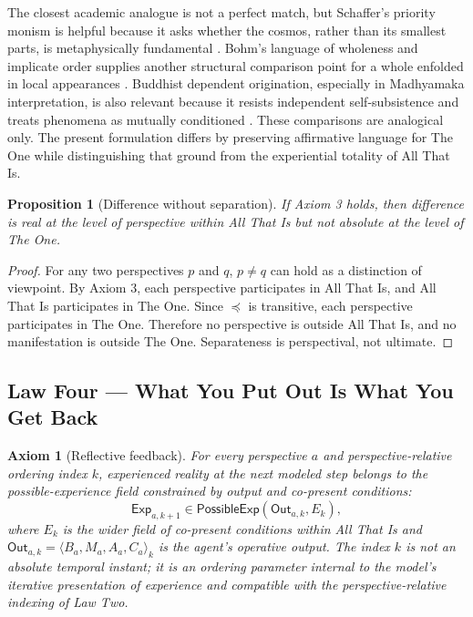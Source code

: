 \documentclass[11pt]{article}
\newtheorem{axiom}{Axiom}
\newtheorem{proposition}{Proposition}
\newcommand{\Out}{\mathsf{Out}}
\newcommand{\Exp}{\mathsf{Exp}}
\newcommand{\PossExp}{\mathsf{PossibleExp}}
\newcommand{\Ground}{\preceq}
\begin{document}
The closest academic analogue is not a perfect match, but Schaffer's priority monism is helpful because it asks whether the cosmos, rather than its smallest parts, is metaphysically fundamental \cite{Schaffer2010}.  Bohm's language of wholeness and implicate order supplies another structural comparison point for a whole enfolded in local appearances \cite{Bohm1980}.  Buddhist dependent origination, especially in Madhyamaka interpretation, is also relevant because it resists independent self-subsistence and treats phenomena as mutually conditioned \cite{Garfield1995,Gethin1998}.  These comparisons are analogical only.  The present formulation differs by preserving affirmative language for The One while distinguishing that ground from the experiential totality of All That Is.

\begin{proposition}[Difference without separation]
If Axiom 3 holds, then difference is real at the level of perspective within All That Is but not absolute at the level of The One.
\end{proposition}

\begin{proof}
For any two perspectives $p$ and $q$, $p\neq q$ can hold as a distinction of viewpoint.  By Axiom 3, each perspective participates in All That Is, and All That Is participates in The One.  Since $\Ground$ is transitive, each perspective participates in The One.  Therefore no perspective is outside All That Is, and no manifestation is outside The One.  Separateness is perspectival, not ultimate.
\end{proof}

\subsection{Law Four --- What You Put Out Is What You Get Back}

\begin{axiom}[Reflective feedback]
For every perspective $a$ and perspective-relative ordering index $k$, experienced reality at the next modeled step belongs to the possible-experience field constrained by output and co-present conditions:
\[
\Exp_{a,k+1}\in\PossExp(\Out_{a,k},E_k),
\]
where $E_k$ is the wider field of co-present conditions within All That Is and $\Out_{a,k}=\langle B_a,M_a,A_a,C_a\rangle_k$ is the agent's operative output.  The index $k$ is not an absolute temporal instant; it is an ordering parameter internal to the model's iterative presentation of experience and compatible with the perspective-relative indexing of Law Two.
\end{axiom}
\end{document}
